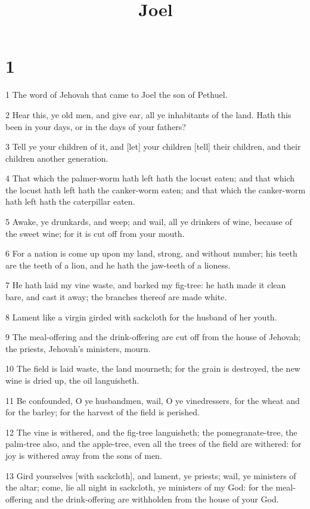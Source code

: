 

\title{Joel}

\chapter{1}

\par 1 The word of Jehovah that came to Joel the son of Pethuel.
\par 2 Hear this, ye old men, and give ear, all ye inhabitants of the land. Hath this been in your days, or in the days of your fathers?
\par 3 Tell ye your children of it, and [let] your children [tell] their children, and their children another generation.
\par 4 That which the palmer-worm hath left hath the locust eaten; and that which the locust hath left hath the canker-worm eaten; and that which the canker-worm hath left hath the caterpillar eaten.
\par 5 Awake, ye drunkards, and weep; and wail, all ye drinkers of wine, because of the sweet wine; for it is cut off from your mouth.
\par 6 For a nation is come up upon my land, strong, and without number; his teeth are the teeth of a lion, and he hath the jaw-teeth of a lioness.
\par 7 He hath laid my vine waste, and barked my fig-tree: he hath made it clean bare, and cast it away; the branches thereof are made white.
\par 8 Lament like a virgin girded with sackcloth for the husband of her youth.
\par 9 The meal-offering and the drink-offering are cut off from the house of Jehovah; the priests, Jehovah's ministers, mourn.
\par 10 The field is laid waste, the land mourneth; for the grain is destroyed, the new wine is dried up, the oil languisheth.
\par 11 Be confounded, O ye husbandmen, wail, O ye vinedressers, for the wheat and for the barley; for the harvest of the field is perished.
\par 12 The vine is withered, and the fig-tree languisheth; the pomegranate-tree, the palm-tree also, and the apple-tree, even all the trees of the field are withered: for joy is withered away from the sons of men.
\par 13 Gird yourselves [with sackcloth], and lament, ye priests; wail, ye ministers of the altar; come, lie all night in sackcloth, ye ministers of my God: for the meal-offering and the drink-offering are withholden from the house of your God.
